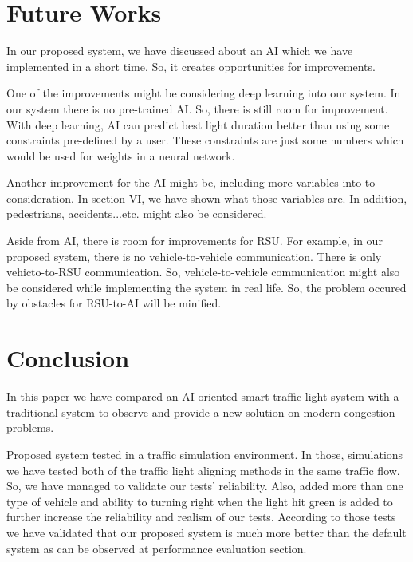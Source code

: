 \documentclass[conference]{IEEEtran}
\begin{document}
\section{Future Works}
    \par In our proposed system, we have discussed about an AI which we have implemented in a short time. So, it creates opportunities for improvements.
    \par One of the improvements might be considering deep learning into our system. In our system there is no pre-trained AI. So, there is still room for improvement. With deep learning, AI can predict best light duration better than using some constraints pre-defined by a user. These constraints are just some numbers which would be used for weights in a neural network.
    \par Another improvement for the AI might be, including more variables into to consideration. In section VI, we have shown what those variables are. In addition, pedestrians, accidents...etc. might also be considered.
    \par Aside from AI, there is room for improvements for RSU. For example, in our proposed system, there is no vehicle-to-vehicle communication. There is only vehicto-to-RSU communication. So, vehicle-to-vehicle communication might also be considered while implementing the system in real life. So, the problem occured by obstacles for RSU-to-AI will be minified.
    
\section{Conclusion}
    \par In this paper we have compared an AI oriented smart traffic light system with a traditional system to observe and provide a new solution on modern congestion problems.
    \par Proposed system tested in a traffic simulation environment. In those, simulations we have tested both of the traffic light aligning methods in the same traffic flow. So, we have managed to validate our tests' reliability. Also, added more than one type of vehicle and ability to turning right when the light hit green is added to further increase the reliability and realism of our tests. According to those tests we have validated that our proposed system is much more better than the default system as can be observed at performance evaluation section.
\end{document}
